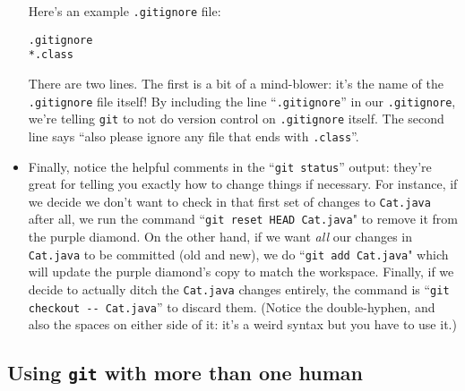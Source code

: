 \begin{itemize}
Here's an example \texttt{.gitignore} file:

\begin{Verbatim}[fontsize=\small,samepage=true,frame=single]
.gitignore
*.class
\end{Verbatim}

There are two lines. The first is a bit of a mind-blower: it's the name of the
\texttt{.gitignore} file itself! By including the line ``\texttt{.gitignore}''
in our \texttt{.gitignore}, we're telling \texttt{git} to not do version
control on \texttt{.gitignore} itself. The second line says ``also please
ignore any file that ends with \texttt{.class}''.

\item Finally, notice the helpful comments in the ``\texttt{git status}''
output: they're great for telling you exactly how to change things if
necessary. For instance, if we decide we don't want to check in that first set
of changes to \texttt{Cat.java} after all, we run the command ``\texttt{git
reset HEAD Cat.java}" to remove it from the purple diamond. On the other hand,
if we want \textit{all} our changes in \texttt{Cat.java} to be committed (old
and new), we do ``\texttt{git add Cat.java}" which will update the purple
diamond's copy to match the workspace. Finally, if we decide to actually ditch
the \texttt{Cat.java} changes entirely, the command is ``\texttt{git checkout
-{}- Cat.java}'' to discard them. (Notice the double-hyphen, and also the
spaces on either side of it: it's a weird syntax but you have to use it.)


\end{itemize}






\subsection{Using \texttt{git} with more than one human}


